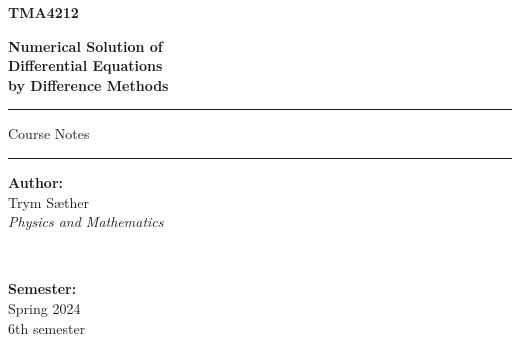 \begin{titlepage}
    \newcommand{\HRule}{\rule{\linewidth}{0.5mm}}
    
    \center
    
    \vspace*{1cm}
    
    {\color{ntnu-blue}\sffamily\Huge\bfseries TMA4212 \par}
    \vspace{0.5cm}
    {\sffamily\huge\bfseries Numerical Solution of \\ Differential Equations \\ by Difference Methods \par}
    
    \vspace{1.5cm}
    
    \HRule
    \vspace{0.5cm}
    
    {\Large\sffamily Course Notes\par}
    
    \vspace{0.5cm}
    \HRule
    
    \vspace{2cm}
    
    \begin{minipage}{0.4\textwidth}
        \begin{flushleft}
            \large
            \textbf{Author:}\\
            Trym Sæther\\
            \textit{Physics and Mathematics}
        \end{flushleft}
    \end{minipage}
    ~
    \begin{minipage}{0.4\textwidth}
        \begin{flushright}
            \large
            \textbf{Semester:}\\
            Spring 2024\\
            6th semester
        \end{flushright}
    \end{minipage}
    

\end{titlepage}
